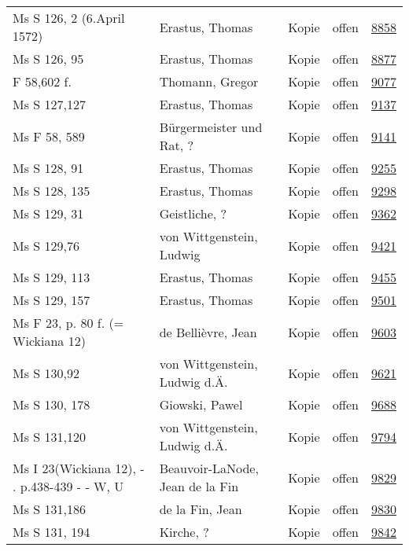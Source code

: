 \documentclass[10pt,a4paper,landscape]{report}
\begin{document}
\begin{longtable}{p{16cm}p{4cm}llr}
Ms S 126, 2 (6.April 1572)	&	Erastus, Thomas	&	Kopie	&	offen	&	\href{http://130.60.24.72/assignment/8858}{8858}\\
Ms S 126, 95	&	Erastus, Thomas	&	Kopie	&	offen	&	\href{http://130.60.24.72/assignment/8877}{8877}\\
F 58,602 f.	&	Thomann, Gregor	&	Kopie	&	offen	&	\href{http://130.60.24.72/assignment/9077}{9077}\\
Ms S 127,127	&	Erastus, Thomas	&	Kopie	&	offen	&	\href{http://130.60.24.72/assignment/9137}{9137}\\
Ms F 58, 589	&	Bürgermeister und Rat, ?	&	Kopie	&	offen	&	\href{http://130.60.24.72/assignment/9141}{9141}\\
Ms S 128, 91	&	Erastus, Thomas	&	Kopie	&	offen	&	\href{http://130.60.24.72/assignment/9255}{9255}\\
Ms S 128, 135	&	Erastus, Thomas	&	Kopie	&	offen	&	\href{http://130.60.24.72/assignment/9298}{9298}\\
Ms S 129, 31	&	Geistliche, ?	&	Kopie	&	offen	&	\href{http://130.60.24.72/assignment/9362}{9362}\\
Ms S 129,76	&	von Wittgenstein, Ludwig	&	Kopie	&	offen	&	\href{http://130.60.24.72/assignment/9421}{9421}\\
Ms S 129, 113	&	Erastus, Thomas	&	Kopie	&	offen	&	\href{http://130.60.24.72/assignment/9455}{9455}\\
Ms S 129, 157	&	Erastus, Thomas	&	Kopie	&	offen	&	\href{http://130.60.24.72/assignment/9501}{9501}\\
Ms F 23, p. 80 f. (= Wickiana 12)	&	de Bellièvre, Jean	&	Kopie	&	offen	&	\href{http://130.60.24.72/assignment/9603}{9603}\\
Ms S 130,92	&	von Wittgenstein, Ludwig d.Ä.	&	Kopie	&	offen	&	\href{http://130.60.24.72/assignment/9621}{9621}\\
Ms S 130, 178	&	Giowski, Pawel	&	Kopie	&	offen	&	\href{http://130.60.24.72/assignment/9688}{9688}\\
Ms S 131,120	&	von Wittgenstein, Ludwig d.Ä.	&	Kopie	&	offen	&	\href{http://130.60.24.72/assignment/9794}{9794}\\
Ms I 23(Wickiana 12), - . p.438-439 - - W, U	&	Beauvoir-LaNode, Jean de la Fin	&	Kopie	&	offen	&	\href{http://130.60.24.72/assignment/9829}{9829}\\
Ms S 131,186	&	de la Fin, Jean	&	Kopie	&	offen	&	\href{http://130.60.24.72/assignment/9830}{9830}\\
Ms S 131, 194	&	Kirche, ?	&	Kopie	&	offen	&	\href{http://130.60.24.72/assignment/9842}{9842}\\

\end{longtable}
\end{document}
